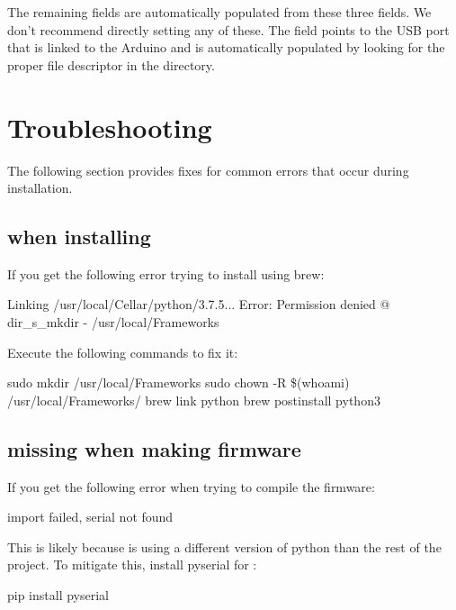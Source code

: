 The remaining fields are automatically populated from these three fields. We
don't recommend directly setting any of these. The  field
points to the USB port that is linked to the Arduino and is automatically
populated by looking for the proper file descriptor in the  directory.


\section{Troubleshooting}

The following section provides fixes for common errors that occur during
installation.

\subsection{ when installing }

\noindent If you get the following error trying to install
 using brew:

\begin{snippet}
Linking /usr/local/Cellar/python/3.7.5... Error: Permission denied @ dir_s_mkdir
- /usr/local/Frameworks
\end{snippet}

\noindent Execute the following commands to fix it:

\begin{snippet}
sudo mkdir /usr/local/Frameworks
sudo chown -R \$(whoami) /usr/local/Frameworks/
brew link python
brew postinstall python3
\end{snippet}

\subsection{ missing when making firmware}


\noindent If you get the following error when trying to compile the firmware:

\begin{snippet}
  import failed, serial not found
\end{snippet}

\noindent This is likely because  is using a different version of python than the rest of the project. To mitigate this, install pyserial for :

\begin{snippet}
pip install pyserial
\end{snippet}


